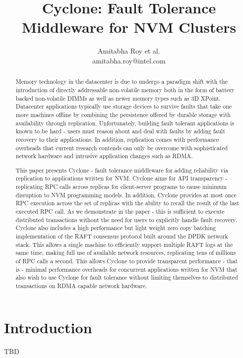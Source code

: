 \documentclass[twocolumn]{article}
\begin{document}
\title{Cyclone: Fault Tolerance Middleware for NVM Clusters}
\author{Amitabha Roy et al. \\ amitabha.roy@intel.com}
\maketitle
\begin{abstract}
Memory technology in the datacenter is due to undergo a paradigm shift with the
introduction of directly addressable non-volatile memory both in the form of
battery backed non-volatile DIMMs as well as newer memory types such as
3D XPoint. Datacenter applications typically use storage devices to survive
faults that take one more machines offline by combining the persistence offered by
durable storage with availability through replication. Unfortunately, building
fault tolerant applications is known to be hard - users must reason about and
deal with faults by adding fault recovery to their applications. In addition,
replication comes with performance overheads that current research contends can
only be overcome with sophisticated network hardware and intrusive application
changes such as RDMA.

This paper presents Cyclone - fault tolerance middleware for adding reliability
via replication to applications written for NVM. Cyclone aims for API
transparency - replicating RPC calls across replicas for client-server programs
to cause minimum disruption to NVM programming models. In addition, Cyclone
provides at most once RPC execution across the set of replicas with the
  ability to recall the result of the last executed RPC call. As we demonstrate
in the paper - this is sufficient to execute distributed transactions without
the need for users to explicitly handle fault recovery. Cyclone also includes a
high performance but light weight zero copy batching implementation of the RAFT
consensus protocol built around the DPDK network stack. This allows a single
machine to efficiently support multiple RAFT logs at the same time, making full
use of available network resources, replicating tens of millions of RPC calls a
second. This allows Cyclone to provide transparent performance - that is -
minimal performance overheads for concurrent applications written for NVM that
also wish to use Cyclone for fault tolerance without limiting themselves to
distributed transactions on RDMA capable network hardware.
\end{abstract}  

\section{Introduction}
TBD
\end{document}
